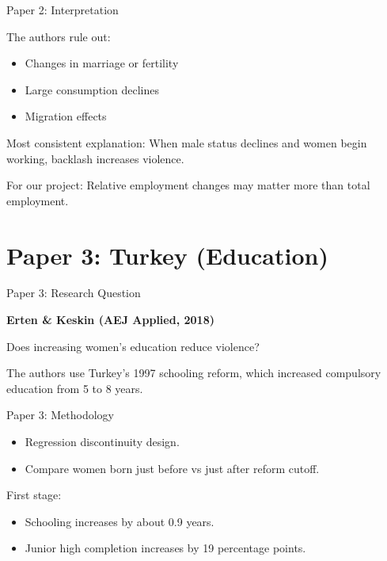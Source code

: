 \documentclass[11pt,aspectratio=169]{beamer}
\begin{document}
\begin{frame}{Paper 2: Interpretation}

The authors rule out:

\begin{itemize}
    \item Changes in marriage or fertility
    \item Large consumption declines
    \item Migration effects
\end{itemize}

\medskip

Most consistent explanation:
When male status declines and women begin working,
backlash increases violence.

\medskip

For our project:
Relative employment changes may matter more than total employment.

\end{frame}

\section{Paper 3: Turkey (Education)}

\begin{frame}{Paper 3: Research Question}

\textbf{Erten \& Keskin (AEJ Applied, 2018)}

\medskip

Does increasing women’s education reduce violence?

\medskip

The authors use Turkey’s 1997 schooling reform,
which increased compulsory education from 5 to 8 years.

\end{frame}

\begin{frame}{Paper 3: Methodology}

\begin{itemize}
    \item Regression discontinuity design.
    \item Compare women born just before vs just after reform cutoff.
\end{itemize}

\medskip

First stage:
\begin{itemize}
    \item Schooling increases by about 0.9 years.
    \item Junior high completion increases by 19 percentage points.
\end{itemize}

\end{frame}
\end{document}
